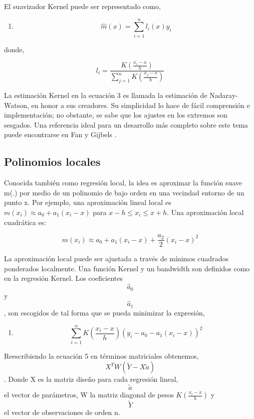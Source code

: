\documentclass[
  12pt,
]{krantz}
\providecommand{\tightlist}{%
  \setlength{\itemsep}{0pt}\setlength{\parskip}{0pt}}
\begin{document}
El suavizador Kernel puede ser representado como,

\begin{enumerate}
\def\labelenumi{(\arabic{enumi})}
\setcounter{enumi}{3}
\tightlist
\item
  \[
  \hat{m}(x) = \sum_{i=1}^{n} l_{i}(x) y_{i} 
  \]
\end{enumerate}

donde,

\[\displaystyle{l_{i} = \frac{K(\frac{x_{i}-x}{h})}{\sum_{j=1}^{n} K(\frac{x_{j}-x}{h})} }\]

La estimación Kernel en la ecuación 3 es llamada la estimación de Nadaray- Watson, en honor a sus creadores. Su simplicidad lo hace de fácil comprensión e implementación; no obstante, se sabe que los ajustes en los extremos son sesgados. Una referencia ideal para un desarrollo más completo sobre este tema puede encontrarse en Fan y Gijbels \cite{FG}.

\hypertarget{polinomios-locales}{%
\subsection{Polinomios locales}\label{polinomios-locales}}

Conocida también como regresión local, la idea es aproximar la función suave m(.) por medio de un polinomio de bajo orden en una vecindad entorno de un punto x. Por ejemplo, una aproximación lineal local es \(m(x_{i}) \approx a_{0} + a_{1}(x_{i}-x)\) para \(x - h \leq x_{i} \leq x+h\). Una aproximación local cuadrática es:

\[\displaystyle{m(x_{i}) \approx  a_{0} + a_{1}(x_{i}-x) + \frac{a_{2}}{2}(x_{i}-x)^2}\]

La aproximación local puede ser ajustada a través de mínimos cuadrados ponderados localmente. Una función Kernel y un bandwidth son definidos como en la regresión Kernel. Los coeficientes \[\hat{a}_{0}\] y \[\hat{a}_{1}\], son escogidos de tal forma que se pueda minimizar la expresión,

\begin{enumerate}
\def\labelenumi{(\arabic{enumi})}
\setcounter{enumi}{4}
\tightlist
\item
  \[
   \sum_{i=1}^{n} K(\frac{x_{i}-x}{h}) (y_{i}-a_{0}-a_{1}(x_{i}-x))^2 
  \]
\end{enumerate}

Reescribiendo la ecuación 5 en términos matriciales obtenemos, \[X^{T}W(\tilde{Y}-X \tilde{a})\]. Donde X es la matriz diseño para cada regresión lineal, \[\tilde{a}\] el vector de
parámetros, W la matriz diagonal de pesos \(K(\frac{x_{i}-x}{h})\) y \[\tilde{Y}\] el vector de observaciones de orden n.
\end{document}
